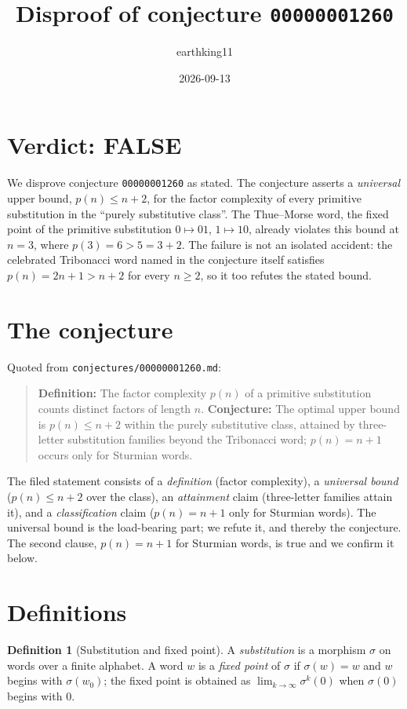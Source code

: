 \documentclass[11pt]{article}
\title{Disproof of conjecture \texttt{00000001260}}
\author{earthking11}
\date{2026-09-13}
\theoremstyle{definition}
\newtheorem{definition}[theorem]{Definition}
\theoremstyle{remark}
\newcommand{\code}[1]{\texttt{#1}}
\begin{document}
\maketitle

\section*{Verdict: FALSE}

We disprove conjecture \texttt{00000001260} as stated. The conjecture asserts a
\emph{universal} upper bound, $p(n) \le n+2$, for the factor complexity of
every primitive substitution in the ``purely substitutive class''. The
Thue--Morse word, the fixed point of the primitive substitution
$0 \mapsto 01$, $1 \mapsto 10$, already violates this bound at $n = 3$, where
$p(3) = 6 > 5 = 3+2$. The failure is not an isolated accident: the celebrated
Tribonacci word named in the conjecture itself satisfies $p(n) = 2n+1 > n+2$
for every $n \ge 2$, so it too refutes the stated bound.

\section{The conjecture}

Quoted from \code{conjectures/00000001260.md}:

\begin{quote}
\textbf{Definition:} The factor complexity $p(n)$ of a primitive substitution
counts distinct factors of length $n$. \textbf{Conjecture:} The optimal upper
bound is $p(n) \le n+2$ within the purely substitutive class, attained by
three-letter substitution families beyond the Tribonacci word; $p(n) = n+1$
occurs only for Sturmian words.
\end{quote}

The filed statement consists of a \emph{definition} (factor complexity), a
\emph{universal bound} ($p(n) \le n+2$ over the class), an \emph{attainment}
claim (three-letter families attain it), and a \emph{classification} claim
($p(n)=n+1$ only for Sturmian words). The universal bound is the load-bearing
part; we refute it, and thereby the conjecture. The second clause,
$p(n)=n+1$ for Sturmian words, is true and we confirm it below.

\section{Definitions}

\begin{definition}[Substitution and fixed point]
A \emph{substitution} is a morphism $\sigma$ on words over a finite alphabet.
A word $w$ is a \emph{fixed point} of $\sigma$ if $\sigma(w)=w$ and $w$ begins
with $\sigma(w_0)$; the fixed point is obtained as
$\lim_{k\to\infty}\sigma^k(0)$ when $\sigma(0)$ begins with $0$.
\end{definition}
\end{document}
